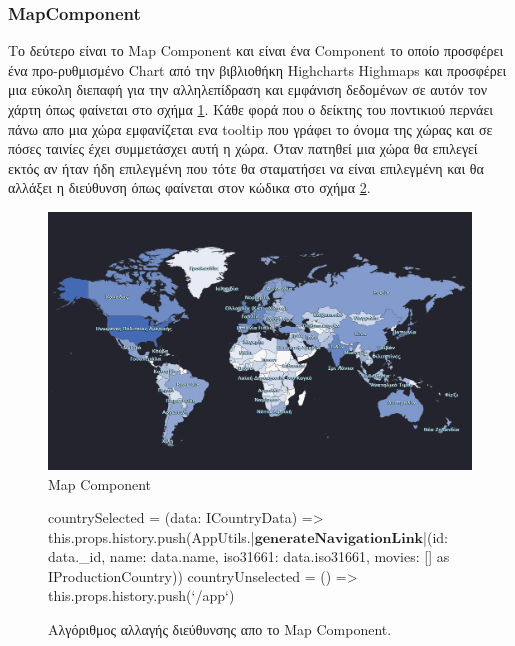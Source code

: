 \subsubsection{MapComponent}
Το δεύτερο είναι το Map Component και είναι ένα Component το οποίο προσφέρει ένα προ-ρυθμισμένο Chart από την βιβλιοθήκη Highcharts Highmaps και προσφέρει μια εύκολη διεπαφή για την αλληλεπίδραση και εμφάνιση δεδομένων σε αυτόν τον χάρτη όπως φαίνεται στο σχήμα \ref{layout:mapcomponent}. Κάθε φορά που ο δείκτης του ποντικιού περνάει πάνω απο μια χώρα εμφανίζεται ενα tooltip που γράφει το όνομα της χώρας και σε πόσες ταινίες έχει συμμετάσχει αυτή η χώρα. Όταν πατηθεί μια χώρα θα επιλεγεί εκτός αν ήταν ήδη επιλεγμένη που τότε θα σταματήσει να είναι επιλεγμένη και θα αλλάξει η διεύθυνση όπως φαίνεται στον κώδικα στο σχήμα \ref{code:map_urlchanger}.
\begin{figure}[H]
  \centering
  \includegraphics[width=140mm]{Chapters/5 - Architecture/Client/Images/world_map.PNG}
  \caption{Map Component}
  \label{layout:mapcomponent}
\end{figure}

\begin{figure}[H]
    \begin{TypeScriptcode}
countrySelected = (data: ICountryData) => {
  this.props.history.push(AppUtils.|$\textbf{generateNavigationLink}$|({id: data._id, name: data.name, iso31661: data.iso31661, movies: []} as IProductionCountry))
}
countryUnselected = () => {
  this.props.history.push(`/app`)
}
    \end{TypeScriptcode}
    \caption{Αλγόριθμος αλλαγής διεύθυνσης απο το Map Component.}
   \label{code:map_urlchanger}
\end{figure}